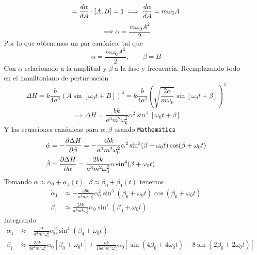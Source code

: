 \documentclass[]{article}
\numberwithin{equation}{section}
\begin{document}
\begin{enumerate}
	\begin{equation}
		[\alpha(A),B] = \td{\alpha}{A} \cdot [A, B] = 1 \implies \td{\alpha}{A} = m \omega_0 A
	\end{equation}
	\begin{equation}
		\implies \alpha = \frac{m \omega_0 A^2}{2}
	\end{equation}
	Por lo que obtenemos un par canónico, tal que
	\begin{equation}
		\alpha = \frac{m \omega_0 A^2}{2}, \qquad \beta = B
	\end{equation}
	Con $\alpha$ relacionado a la amplitud y $\beta$ a la fase y frecuencia. Reemplazando todo en el hamiltoniano de perturbación
	\begin{equation*}
		\Delta H = k \frac{b}{4 a^3} \left(A \sin\left[\omega_0 t + B\right]\right)^4 = k \frac{b}{4 a^3} \left(\sqrt{\frac{2 \alpha}{m \omega_0}} \sin\left[\omega_0 t + \beta\right]\right)^4
	\end{equation*}
	\begin{equation}
		\implies \Delta H = \frac{b k}{a^3 m^2 \omega_0^2} \alpha^2 \sin^4\left[\omega_0 t + \beta\right]
	\end{equation}
	Y las ecuaciones canónicas para $\alpha,\beta$ usando \texttt{Mathematica}
	\begin{align}
		\dot{\alpha} &= - \dfrac{\partial \Delta H}{\partial \beta} = -\frac{4 b k }{a^3 m^2 \omega_0 ^2} \alpha ^2 \sin ^3(\beta + \omega_0 t) \cos (\beta + \omega_0 t)\\
		\dot{\beta} &= \dfrac{\partial \Delta H}{\partial \alpha} = \frac{2 b k }{a^3 m^2 \omega_0 ^2} \alpha \sin ^4(\beta + \omega_0 t )
	\end{align}	
	Tomando $\alpha \approx \alpha_0 + \alpha_1(t), ~ \beta \approx \beta_0 + \beta_1(t)$ tenemos
	\begin{align}
		\dot{\alpha}_1 &\approx -\frac{4 b k }{a^3 m^2 \omega_0 ^2} \alpha_0 ^2 \sin ^3(\beta_0 + \omega_0 t) \cos (\beta_0 + \omega_0 t)\\
		\dot{\beta}_1 &\approx \frac{2 b k }{a^3 m^2 \omega_0 ^2} \alpha_0 \sin ^4(\beta_0 + \omega_0 t )
	\end{align}
	Integrando
	\begin{align}
		\alpha_1 &\approx -\frac{b k }{a^3 m^2 \omega_0 ^3} \alpha_0 ^2 \sin ^4(\beta_0 + \omega_0 t )\\
		\beta_1 &\approx \frac{3 b k}{4 a^3 m^2 \omega_0 ^3} \alpha_0 \left[\beta_0 + \omega_0 t\right] + \frac{b k }{16 a^3 m^2 \omega_0 ^3} \alpha_0 \left[\sin (4 \beta_0 + 4 \omega_0 t) - 8 \sin (2 \beta_0 +2 \omega_0 t )\right]

\end{align}
\end{enumerate}
\end{document}
